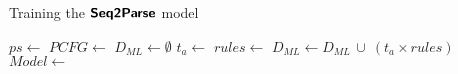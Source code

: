 \begin{algorithm}[t]
    \caption{Training the $\bm{\mathsf{Seq2Parse}}$ model}
    \label{algo:training-classifier}
    \renewcommand{\algorithmicrequire}{\textbf{Input:}}
    \renewcommand{\algorithmicensure}{\textbf{Output:}}
    \begin{algorithmic}[1]
    \State $ps \gets$ 
    \State $PCFG \gets$ 
    \State $D_{ML} \gets \emptyset$
      \State $t_a \gets$ 
      \State $rules \gets$ 
      \State $D_{ML} \gets D_{ML}\,\cup\ (t_a \times rules)$
    \EndFor
    \State $Model \gets$ 
    \State {}
    \EndProcedure
    \end{algorithmic}
\end{algorithm}
